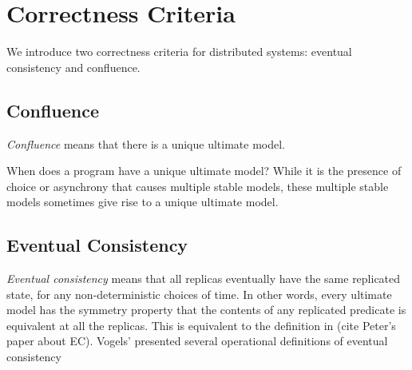 \section{Correctness Criteria}

We introduce two correctness criteria for distributed systems: eventual consistency and confluence.

\subsection{Confluence}

{\em Confluence} means that there is a unique ultimate model.

When does a \lang program have a unique ultimate model?  While it is the presence of choice or asynchrony that causes multiple stable models, these multiple stable models sometimes give rise to a unique ultimate model.

\subsection{Eventual Consistency}

{\em Eventual consistency} means that all replicas eventually have the same replicated state, for any non-deterministic choices of time.  In other words, every ultimate model has the symmetry property that the contents of any replicated predicate is equivalent at all the replicas.  This is equivalent to the definition in (cite Peter's paper about EC).  Vogels' presented several operational definitions of eventual consistency 





